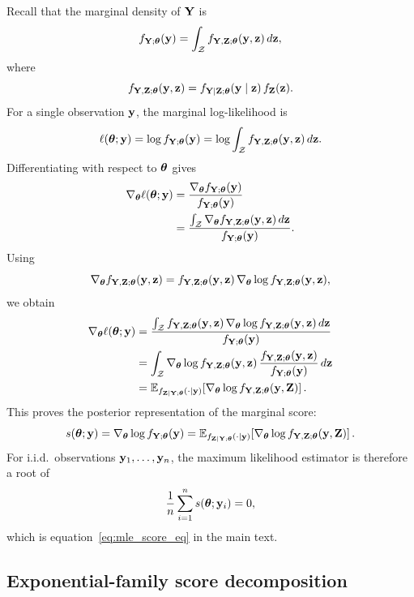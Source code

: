 \documentclass[twoside,11pt]{article}
\begin{document}
Recall that the marginal density of \(\Y\) is
\[
f_{\Y;\bt}(\y)
=
\int_{\mathcal Z} f_{\Y,\Z;\bt}(\y,\z)\,d\z,
\]
where
\[
f_{\Y,\Z;\bt}(\y,\z)
=
f_{\Y\mid\Z;\bt}(\y\mid \z)\,f_\Z(\z).
\]
For a single observation \(\y\), the marginal log-likelihood is
\[
\ell(\bt;\y)
=
\log f_{\Y;\bt}(\y)
=
\log \int_{\mathcal Z} f_{\Y,\Z;\bt}(\y,\z)\,d\z.
\]
Differentiating with respect to \(\bt\) gives
\begin{align}
\nabla_\bt \ell(\bt;\y)
&=
\frac{\nabla_\bt f_{\Y;\bt}(\y)}{f_{\Y;\bt}(\y)}
\nonumber\\
&=
\frac{\int_{\mathcal Z} \nabla_\bt f_{\Y,\Z;\bt}(\y,\z)\,d\z}{f_{\Y;\bt}(\y)}.
\label{eq:appendix_score_step1}
\end{align}
Using
\[
\nabla_\bt f_{\Y,\Z;\bt}(\y,\z)
=
f_{\Y,\Z;\bt}(\y,\z)\,\nabla_\bt \log f_{\Y,\Z;\bt}(\y,\z),
\]
we obtain
\begin{align}
\nabla_\bt \ell(\bt;\y)
&=
\frac{\int_{\mathcal Z} f_{\Y,\Z;\bt}(\y,\z)\,\nabla_\bt \log f_{\Y,\Z;\bt}(\y,\z)\,d\z}{f_{\Y;\bt}(\y)}
\nonumber\\
&=
\int_{\mathcal Z}
\nabla_\bt \log f_{\Y,\Z;\bt}(\y,\z)\,
\frac{f_{\Y,\Z;\bt}(\y,\z)}{f_{\Y;\bt}(\y)}
\,d\z
\nonumber\\
&=
\mathbb E_{f_{\Z\mid\Y;\bt}(\cdot\mid \y)}
\!\left[
\nabla_\bt \log f_{\Y,\Z;\bt}(\y,\Z)
\right].
\label{eq:appendix_score_identity}
\end{align}
This proves the posterior representation of the marginal score:
\[
s(\bt;\y)
=
\nabla_\bt \log f_{\Y;\bt}(\y)
=
\mathbb E_{f_{\Z\mid\Y;\bt}(\cdot\mid \y)}
\!\left[
\nabla_\bt \log f_{\Y,\Z;\bt}(\y,\Z)
\right].
\]
For i.i.d.\ observations \(\y_1,\dots,\y_n\), the maximum likelihood estimator is therefore a root of
\[
\frac1n\sum_{i=1}^n s(\bt;\y_i)=0,
\]
which is equation~\eqref{eq:mle_score_eq} in the main text.

\subsection{Exponential-family score decomposition}
\label{apx:expfam-score-decomp}
\end{document}
